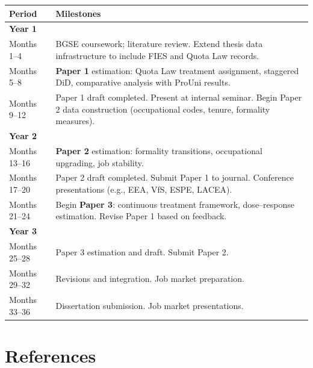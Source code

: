 \documentclass[a4paper,11pt]{article}
\begin{document}
\begin{table}[h]
\centering
\small
\begin{tabular}{@{}lp{10.5cm}@{}}
\toprule
\textbf{Period} & \textbf{Milestones} \\
\midrule
\textbf{Year 1} & \\
Months 1--4 & BGSE coursework; literature review. Extend thesis data infrastructure to include FIES and Quota Law records. \\
Months 5--8 & \textbf{Paper 1} estimation: Quota Law treatment assignment, staggered DiD, comparative analysis with ProUni results. \\
Months 9--12 & Paper 1 draft completed. Present at internal seminar. Begin Paper 2 data construction (occupational codes, tenure, formality measures). \\[4pt]
\textbf{Year 2} & \\
Months 13--16 & \textbf{Paper 2} estimation: formality transitions, occupational upgrading, job stability. \\
Months 17--20 & Paper 2 draft completed. Submit Paper 1 to journal. Conference presentations (e.g., EEA, VfS, ESPE, LACEA). \\
Months 21--24 & Begin \textbf{Paper 3}: continuous treatment framework, dose--response estimation. Revise Paper 1 based on feedback. \\[4pt]
\textbf{Year 3} & \\
Months 25--28 & Paper 3 estimation and draft. Submit Paper 2. \\
Months 29--32 & Revisions and integration. Job market preparation. \\
Months 33--36 & Dissertation submission. Job market presentations. \\
\bottomrule
\end{tabular}
\end{table}

\section{References}
\end{document}
